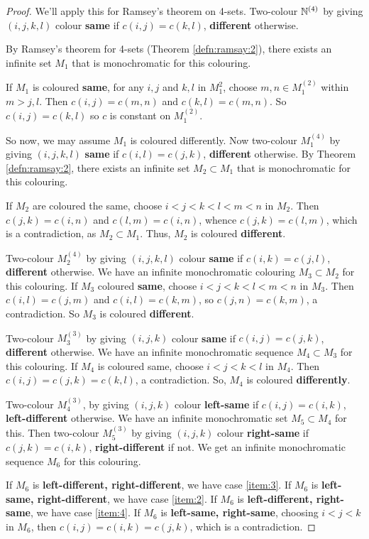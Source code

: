\begin{proof}
  We'll apply this for Ramsey's theorem on 4-sets.  Two-colour
  $\mathbb{N}^{(4)}$ by giving $(i,j,k,l)$ colour \textbf{same} if $c(i, j) =
  c(k, l)$, \textbf{different} otherwise.

  By Ramsey's theorem for 4-sets (Theorem \ref{defn:ramsay:2}), there
  exists an infinite set $M_{1}$ that is monochromatic for this
  colouring.

  If $M_{1}$ is coloured \textbf{same}, for any $i, j$ and $k, l$ in
  $M_{1}^{2}$, choose $m, n \in M_{1}^{(2)}$ within $m > j, l$.  Then
  $c(i, j) = c(m, n)$ and $c(k, l) = c(m, n)$.  So $c(i, j) = c(k, l)$
  so $c$ is constant on $M_{1}^{(2)}$.

  So now, we may assume $M_{1}$ is coloured differently.  Now
  two-colour $M_{1}^{(4)}$ by giving $(i,j,k,l)$ \textbf{same} if
  $c(i, l) = c(j, k)$, \textbf{different} otherwise. By Theorem
  \ref{defn:ramsay:2}, there exists an infinite set $M_{2} \subset
  M_{1}$ that is monochromatic for this colouring.

  If $M_{2}$ are coloured the same, choose $i < j < k < l < m < n$ in
  $M_{2}$. Then $c(j, k) = c(i, n)$ and $c(l, m) = c(i, n)$, whence
  $c(j, k) = c(l, m)$, which is a contradiction, as $M_{2} \subset
  M_{1}$.
  Thus, $M_{2}$ is coloured \textbf{different}.

  Two-colour $M_{2}^{(4)}$ by giving $(i,j,k,l)$ colour \textbf{same}
  if $c(i, k)  = c(j, l)$, \textbf{different} otherwise.  We have an
  infinite monochromatic colouring $M_{3} \subset M_{2}$ for this
  colouring.  If $M_{3}$ coloured \textbf{same}, choose $i < j < k < l
  < m < n$ in $M_{3}$.  Then $c(i,l) = c(j,m)$ and $c(i, l) = c(k,
  m)$, so $c(j, n) = c(k, m)$, a contradiction.  So $M_{3}$ is
  coloured \textbf{different}.

  Two-colour $M_{3}^{(3)}$ by giving $(i,j,k)$ colour \textbf{same} if
  $c(i,j) = c(j, k)$, \textbf{different} otherwise.  We have an
  infinite monochromatic sequence $M_{4} \subset M_{3}$ for this
  colouring.  If $M_{4}$ is coloured same, choose $i < j < k < l$ in
  $M_{4}$.  Then $c(i, j) = c(j, k) = c(k, l)$, a contradiction.  So,
  $M_{4}$ is coloured \textbf{differently}.

  Two-colour $M_{4}^{(3)}$, by giving $(i, j, k)$ colour
  \textbf{left-same} if $c(i, j) = c(i, k)$, \textbf{left-different}
  otherwise. We have an infinite monochromatic set $M_{5} \subset
  M_{4}$ for this.  Then two-colour $M_{5}^{(3)}$ by giving $(i, j,
  k)$ colour \textbf{right-same} if $c(j, k) = c(i, k)$,
  \textbf{right-different} if not.  We get an infinite monochromatic
  sequence $M_{6}$ for this colouring.

  If $M_{6}$ is \textbf{left-different, right-different}, we have case
  \ref{item:3}.  If $M_{6}$ is \textbf{left-same, right-different}, we
  have case \ref{item:2}.  If $M_{6}$ is \textbf{left-different,
    right-same}, we have case \ref{item:4}.  If $M_{6}$ is
  \textbf{left-same, right-same}, choosing $i < j < k$ in $M_{6}$,
  then $c(i, j) = c(i, k) = c(j, k)$, which is a contradiction.
\end{proof}


